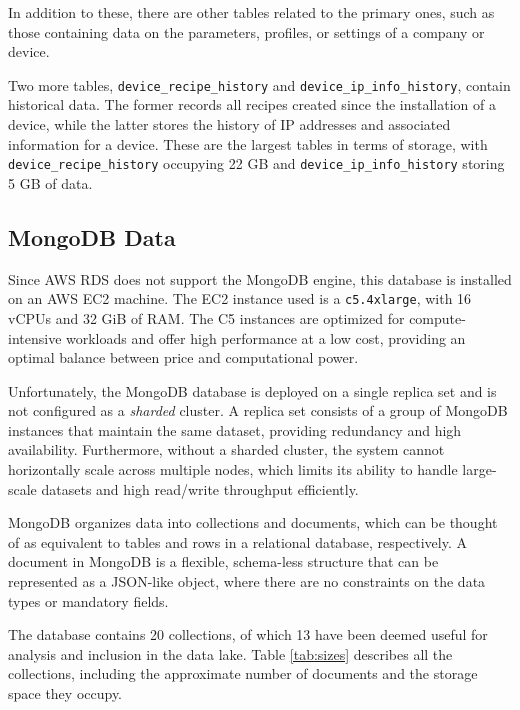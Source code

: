 In addition to these, there are other tables related to the primary ones, such as those containing data on the parameters, profiles, or settings of a company or device.

Two more tables, \texttt{device\_recipe\_history} and \texttt{device\_ip\_info\_history}, contain historical data. The former records all recipes created since the installation of a device, while the latter stores the history of IP addresses and associated information for a device. These are the largest tables in terms of storage, with \texttt{device\_recipe\_history} occupying 22 GB and \texttt{device\_ip\_info\_history} storing 5 GB of data.

\subsection{MongoDB Data}
Since \ac{AWS} \ac{RDS} does not support the MongoDB engine, this database is installed on an \ac{AWS} \ac{EC2} machine. The \ac{EC2} instance used is a \texttt{c5.4xlarge}, with 16 vCPUs and 32 GiB of \ac{RAM}. The C5 instances are optimized for compute-intensive workloads and offer high performance at a low cost, providing an optimal balance between price and computational power.

Unfortunately, the MongoDB database is deployed on a single replica set and is not configured as a \textit{sharded} cluster. A replica set consists of a group of MongoDB instances that maintain the same dataset, providing redundancy and high availability. Furthermore, without a sharded cluster, the system cannot horizontally scale across multiple nodes, which limits its ability to handle large-scale datasets and high read/write throughput efficiently.

MongoDB organizes data into collections and documents, which can be thought of as equivalent to tables and rows in a relational database, respectively. A document in MongoDB is a flexible, schema-less structure that can be represented as a \ac{JSON}-like object, where there are no constraints on the data types or mandatory fields.

The database contains 20 collections, of which 13 have been deemed useful for analysis and inclusion in the data lake. Table \ref{tab:sizes} describes all the collections, including the approximate number of documents and the storage space they occupy.

